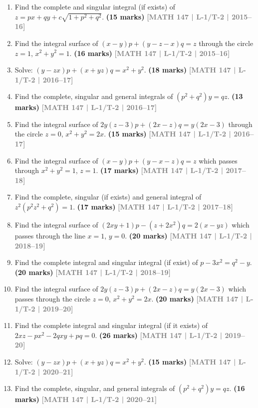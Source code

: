 \documentclass[12pt,a4paper]{article}
\newcommand{\yr}[1]{\hfill\textcolor{gray}{\small\textbf{[#1]}}}
\newcommand{\mk}[1]{\textcolor{orange!70!black}{\small\textbf{(#1 marks)}}}
\begin{document}
\begin{enumerate}
\item Find the complete and singular integral (if exists) of $z=px+qy+c\sqrt{{1}+p^{2}+q^{2}}$.
\mk{15} \yr{MATH 147 | L-1/T-2 | 2015--16}

\item Find the integral surface of $(x-y)p+(y-z-x)q=z$ through the circle $z=1$, $x^{2}+y^{2}=1$.
\mk{16} \yr{MATH 147 | L-1/T-2 | 2015--16}

\item Solve: $(y-zx)p+(x+yz)q=x^{2}+y^{2}$.
\mk{18} \yr{MATH 147 | L-1/T-2 | 2016--17}

\item Find the complete, singular and general integrals of $(p^{2}+q^{2})y=qz$.
\mk{13} \yr{MATH 147 | L-1/T-2 | 2016--17}

\item Find the integral surface of $2y(z-3)p+(2x-z)q=y(2x-3)$ through the circle $z=0$, $x^{2}+y^{2}=2x$.
\mk{15} \yr{MATH 147 | L-1/T-2 | 2016--17}

\item Find the integral surface of $(x-y)p+(y-x-z)q=z$ which passes through $x^{2}+y^{2}=1$, $z=1$.
\mk{17} \yr{MATH 147 | L-1/T-2 | 2017--18}

\item Find the complete, singular (if exists) and general integral of $z^{2}(p^{2}z^{2}+q^{2})=1$.
\mk{17} \yr{MATH 147 | L-1/T-2 | 2017--18}

\item Find the integral surface of $(2xy+1)p-(z+2x^{2})q=2(x-yz)$ which passes through the line $x=1$, $y=0$.
\mk{20} \yr{MATH 147 | L-1/T-2 | 2018--19}

\item Find the complete integral and singular integral (if exist) of $p-3x^{2}=q^{2}-y$.
\mk{20} \yr{MATH 147 | L-1/T-2 | 2018--19}

\item Find the integral surface of $2y(z-3)p+(2x-z)q=y(2x-3)$ which passes through the circle $z=0$, $x^{2}+y^{2}=2x$.
\mk{20} \yr{MATH 147 | L-1/T-2 | 2019--20}

\item Find the complete integral and singular integral (if it exists) of $2xz-px^{2}-2qxy+pq=0$.
\mk{26} \yr{MATH 147 | L-1/T-2 | 2019--20}

\item Solve: $(y-zx)p+(x+yz)q=x^{2}+y^{2}$.
\mk{15} \yr{MATH 147 | L-1/T-2 | 2020--21}

\item Find the complete, singular, and general integrals of $(p^{2}+q^{2})y=qz$.
\mk{16} \yr{MATH 147 | L-1/T-2 | 2020--21}


\end{enumerate}
\end{document}
